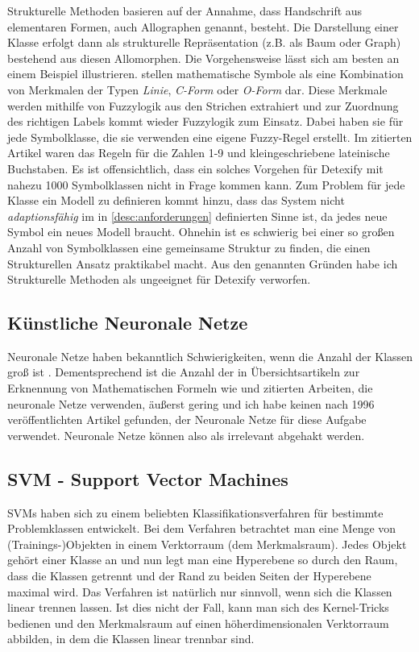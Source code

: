 Strukturelle Methoden basieren auf der Annahme, dass Handschrift aus elementaren Formen, auch Allographen genannt, besteht. Die Darstellung einer Klasse erfolgt dann als strukturelle Repräsentation (z.B. als Baum oder Graph) bestehend aus diesen Allomorphen. Die Vorgehensweise lässt sich am besten an einem Beispiel illustrieren. \citet{Fitzgerald:2004p10858} stellen mathematische Symbole als eine Kombination von Merkmalen der Typen \emph{Linie}, \emph{C-Form} oder \emph{O-Form} dar. Diese Merkmale werden mithilfe von Fuzzylogik aus den Strichen extrahiert und zur Zuordnung des richtigen Labels kommt wieder Fuzzylogik zum Einsatz. Dabei haben sie für jede Symbolklasse, die sie verwenden eine eigene Fuzzy-Regel erstellt. Im zitierten Artikel waren das Regeln für die Zahlen 1-9 und kleingeschriebene lateinische Buchstaben. Es ist offensichtlich, dass ein solches Vorgehen für Detexify mit nahezu 1000 Symbolklassen nicht in Frage kommen kann. Zum Problem für jede Klasse ein Modell zu definieren kommt hinzu, dass das System nicht \emph{adaptionsfähig} im in \ref{desc:anforderungen} definierten Sinne ist, da jedes neue Symbol ein neues Modell braucht. Ohnehin ist es schwierig bei einer so großen Anzahl von Symbolklassen eine gemeinsame Struktur zu finden, die einen Strukturellen Ansatz praktikabel macht. Aus den genannten Gründen habe ich Strukturelle Methoden als ungeeignet für Detexify verworfen.

\subsection{Künstliche Neuronale Netze} \label{sub:kuenstliche_neuronale_netze}

Neuronale Netze haben bekanntlich Schwierigkeiten, wenn die Anzahl der Klassen groß ist \cite{Jaeger:2003p1097}. Dementsprechend ist die Anzahl der in Übersichtsartikeln zur Erknennung von Mathematischen Formeln wie \cite{Chan:2000p559} und \cite{Tapia:2007p9160} zitierten Arbeiten, die neuronale Netze verwenden, äußerst gering und ich habe keinen nach 1996 veröffentlichten Artikel gefunden, der Neuronale Netze für diese Aufgabe verwendet. Neuronale Netze können also als irrelevant abgehakt werden.

\subsection[SVM]{SVM - Support Vector Machines} \label{sub:svm}

\ac{SVM}s haben sich zu einem beliebten Klassifikationsverfahren für bestimmte Problemklassen entwickelt. Bei dem Verfahren betrachtet man eine Menge von (Trainings-)Objekten in einem Verktorraum (dem Merkmalsraum). Jedes Objekt gehört einer Klasse an und nun legt man eine Hyperebene so durch den Raum, dass die Klassen getrennt und der Rand zu beiden Seiten der Hyperebene maximal wird. Das Verfahren ist natürlich nur sinnvoll, wenn sich die Klassen linear trennen lassen. Ist dies nicht der Fall, kann man sich des Kernel-Tricks bedienen und den Merkmalsraum auf einen höherdimensionalen Verktorraum abbilden, in dem die Klassen linear trennbar sind.

